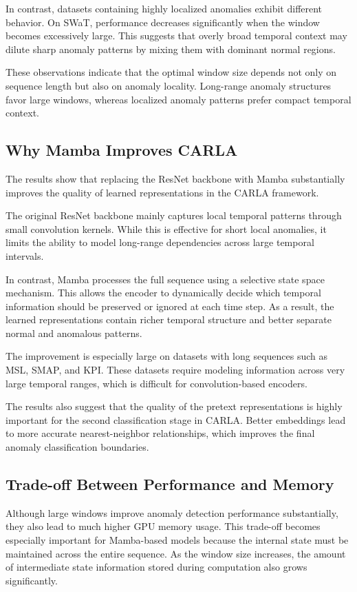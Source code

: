 \documentclass[runningheads]{llncs}
\begin{document}
In contrast, datasets containing highly localized anomalies exhibit different behavior. On SWaT, performance decreases significantly when the window becomes excessively large. This suggests that overly broad temporal context may dilute sharp anomaly patterns by mixing them with dominant normal regions.

These observations indicate that the optimal window size depends not only on sequence length but also on anomaly locality. Long-range anomaly structures favor large windows, whereas localized anomaly patterns prefer compact temporal context.

\subsection{Why Mamba Improves CARLA}

The results show that replacing the ResNet backbone with Mamba substantially improves the quality of learned representations in the CARLA framework.

The original ResNet backbone mainly captures local temporal patterns through small convolution kernels. While this is effective for short local anomalies, it limits the ability to model long-range dependencies across large temporal intervals.

In contrast, Mamba processes the full sequence using a selective state space mechanism. This allows the encoder to dynamically decide which temporal information should be preserved or ignored at each time step. As a result, the learned representations contain richer temporal structure and better separate normal and anomalous patterns.

The improvement is especially large on datasets with long sequences such as MSL, SMAP, and KPI. These datasets require modeling information across very large temporal ranges, which is difficult for convolution-based encoders.

The results also suggest that the quality of the pretext representations is highly important for the second classification stage in CARLA. Better embeddings lead to more accurate nearest-neighbor relationships, which improves the final anomaly classification boundaries.

\subsection{Trade-off Between Performance and Memory}

Although large windows improve anomaly detection performance substantially, they also lead to much higher GPU memory usage. This trade-off becomes especially important for Mamba-based models because the internal state must be maintained across the entire sequence. As the window size increases, the amount of intermediate state information stored during computation also grows significantly.
\end{document}

